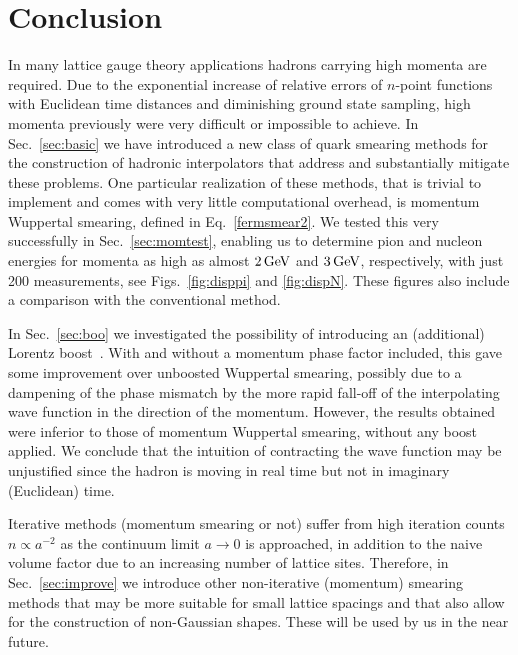 \section{Conclusion}
In many lattice gauge theory applications hadrons carrying high
momenta are required. Due to the exponential increase of relative
errors of $n$-point functions with Euclidean time distances and diminishing
ground state sampling, high momenta previously were very difficult
or impossible to achieve. In Sec.~\ref{sec:basic}
we have introduced a new class of quark smearing methods
for the construction of hadronic interpolators that address and substantially
mitigate these problems. One particular realization of these
methods, that is trivial to implement and comes with very little computational
overhead, is momentum Wuppertal smearing, defined in Eq.~\eqref{fermsmear2}.
We tested this very successfully in Sec.~\ref{sec:momtest}, enabling us to
determine pion and nucleon energies for momenta as high as almost $2\,\textmd{GeV}$
and $3\,\textmd{GeV}$, respectively, with just 200 measurements, see
Figs.~\ref{fig:disppi} and \ref{fig:dispN}. These figures
also include a comparison
with the conventional method.

In Sec.~\ref{sec:boo} we investigated
the possibility of introducing an (additional)
Lorentz boost~\cite{Roberts:2012tp,DellaMorte:2012xc}. 
With and without a momentum phase factor included,
this gave some improvement over unboosted Wuppertal smearing,
possibly due to a dampening of the phase mismatch by
the more rapid fall-off of the interpolating wave function
in the direction of the momentum.
However, the results obtained were inferior to those of
momentum Wuppertal smearing, without any boost applied.
We conclude that the intuition of contracting the
wave function may be unjustified
since the hadron is moving in real time but not in imaginary
(Euclidean) time.

Iterative methods
(momentum smearing or not) suffer from high iteration
counts $n\propto a^{-2}$ as the continuum limit $a\rightarrow 0$
is approached, in addition to the naive volume factor due to an increasing
number of lattice sites. Therefore, in Sec.~\ref{sec:improve}
we introduce other non-iterative (momentum) smearing methods
that may be more suitable for small lattice spacings
and that also allow for the construction of non-Gaussian shapes.
These will be used by us in the near future.

